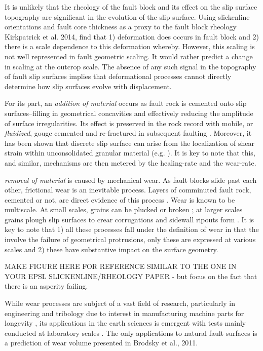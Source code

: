 \documentclass[12pt,a4paper]{article}
\begin{document}
It is unlikely that the rheology of the fault block and its effect on the slip surface topography are significant in the evolution of the slip surface. Using slickenline orientations and fault core thickness as a proxy to the fault block rheology Kirkpatrick et al. 2014, find that 1) deformation does occurs in fault block and 2) there is a scale dependence to this deformation whereby. However, this scaling is not well represented in fault geometric scaling. It would rather predict a change in scaling at the outcrop scale. The absence of any such signal in the topography of fault slip surfaces implies that deformational processes cannot directly determine how slip surfaces evolve with displacement.

For its part, an \textit{addition of material} occurs as fault rock is cemented onto slip surfaces--filling in geometrical concavities and effectively reducing the amplitude of surface irregularities. Its effect is preserved in the rock record with mobile, or \textit{fluidized}, gouge cemented and re-fractured in subsequent faulting \cite{sagy2009geometric, shervais2016smoothing}. Moreover, it has been shown that discrete slip surface can arise from the localization of shear strain within unconsolidated granular material (e.g. \cite{chambon2006thickness}). It is key to note that this, and similar, mechanisms are then metered by the healing-rate and the wear-rate.

\textit{removal of material} is caused by mechanical wear. As fault blocks slide past each other, frictional wear is an inevitable process. Layers of comminuted fault rock, cemented or not, are direct evidence of this process \cite{power1988roughness, scholz1987wear}. Wear is known to be multiscale. At small scales, grains can be plucked or broken \cite{shervais2016smoothing}; at larger scales grains plough slip surfaces to crear corrugations \cite{scholz1976role} and sidewall ripouts form \cite{swanson1989sidewall}. It is key to note that 1) all these processes fall under the definition of wear in that the involve the failure of geometrical protrusions, only these are expressed at various scales and 2) these have substantive impact on the surface geometry.

MAKE FIGURE HERE FOR REFERENCE SIMILAR TO THE ONE IN YOUR EPSL SLICKENLINE/RHEOLOGY PAPER - but focus on the fact that there is an asperity failing. 

While wear processes are subject of a vast field of research, particularly in engineering and tribology due to interest in manufacturing machine parts for longevity \cite{meng1995wear}, its  applications in the earth sciences is emergent with tests mainly conducted at laboratory scales \cite{power1988roughness, scholz1987wear, wang1994wear, rathburn2013Numerical}. The only applications to natural fault surfaces is a prediction of wear volume presented in Brodsky et al., 2011. 
\end{document}
